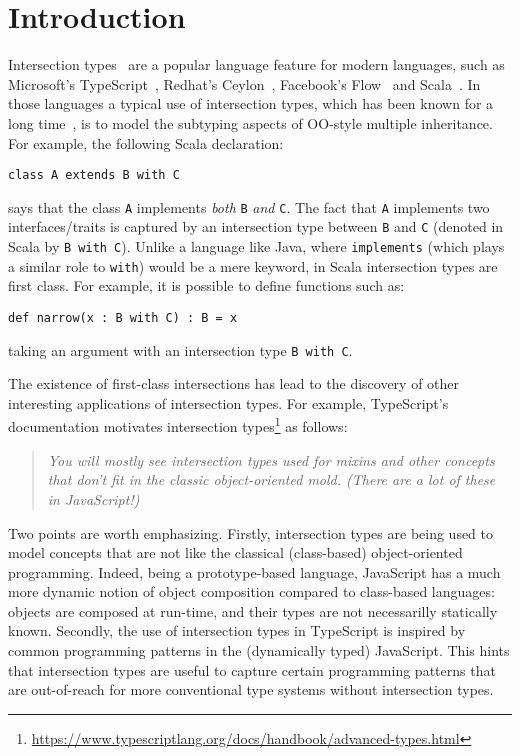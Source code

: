 \section{Introduction}
\label{sec:intro}

Intersection types~\cite{coppo1981functional,Pottinger80type} are a popular language feature for
modern languages, such as Microsoft's TypeScript~\cite{typescript}, 
Redhat's Ceylon~\cite{ceylon}, Facebook's Flow~\cite{flow} and
Scala~\cite{scala-overview}.
In those languages a typical use of intersection
types, which has been known for a long time~\cite{comppier96}, 
is to model the subtyping aspects of OO-style multiple inheritance. 
For example, the following Scala declaration:

\begin{lstlisting}
class A extends B with C
\end{lstlisting}

\noindent says that the class \lstinline{A} implements \emph{both}
\lstinline{B} \emph{and} \lstinline{C}. The fact that \lstinline{A}
implements two interfaces/traits is captured by an intersection type
between \lstinline{B} and \lstinline{C} (denoted in Scala by
\lstinline{B with C}). Unlike a language like Java, where
\lstinline{implements} (which plays a similar role to
\lstinline{with}) would be a mere keyword, in Scala
intersection types are first class. For example, it is possible to define 
functions such as:

\begin{lstlisting}
def narrow(x : B with C) : B = x
\end{lstlisting}

\noindent taking an argument with an intersection
type \lstinline{B with C}. 

The existence of first-class intersections has lead to the
discovery of other interesting applications of intersection types. 
For example, TypeScript's documentation motivates intersection
types\footnote{\url{https://www.typescriptlang.org/docs/handbook/advanced-types.html}}
as follows:

\begin{quote}
\emph{You will mostly see intersection types used for mixins and other
concepts that don’t fit in the classic object-oriented mold. (There are a lot of these in JavaScript!)}
\end{quote}

\noindent Two points are worth emphasizing. Firstly, 
intersection types are being used to model concepts that are not
like the classical (class-based) object-oriented programming. Indeed, 
being a prototype-based language, JavaScript has a much more dynamic 
notion of object composition compared to class-based languages:
objects are composed at run-time, and their types are not necessarilly
statically known. Secondly, the use of intersection types in
TypeScript is inspired by common programming patterns in the
(dynamically typed) JavaScript. This hints that intersection types are 
useful to capture certain programming patterns that are out-of-reach for
more conventional type systems without intersection types.

